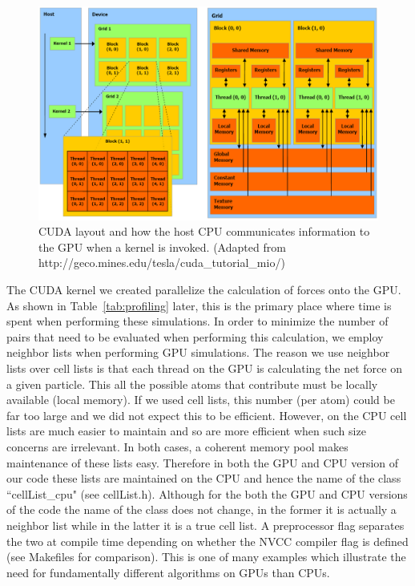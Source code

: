 \documentclass[12pt]{article}
\begin{document}
\begin{figure}[H]
   	\includegraphics[width=\textwidth]{gpu2.png}
	\caption{CUDA layout and how the host CPU communicates information to the GPU when a kernel is invoked. (Adapted from http://geco.mines.edu/tesla/cuda\_tutorial\_mio/)}
	\label{fig:cuda}
\end{figure}

The CUDA kernel we created parallelize the calculation of forces onto the GPU.  As shown in Table~\ref{tab:profiling} later, this is the primary place where time is spent when performing these simulations.  In order to minimize the number of pairs that need to be evaluated when performing this calculation, we employ neighbor lists when performing GPU simulations.  The reason we use neighbor lists over cell lists is that each thread on the GPU is calculating the net force on a given particle.  This all the possible atoms that contribute must be locally available (local memory).  If we used cell lists, this number (per atom) could be far too large and we did not expect this to be efficient.  However, on the CPU cell lists are much easier to maintain and so are more efficient when such size concerns are irrelevant.  In both cases, a coherent memory pool makes maintenance of these lists easy. Therefore in both the GPU and CPU version of our code these lists are maintained on the CPU and hence the name of the class ``cellList\_cpu" (see cellList.h).  Although for the both the GPU and CPU versions of the code the name of the class does not change, in the former it is actually a neighbor list while in the latter it is a true cell list.  A preprocessor flag separates the two at compile time depending on whether the NVCC compiler flag is defined (see Makefiles for comparison).  This is one of many examples which illustrate the need for fundamentally different algorithms on GPUs than CPUs.
\end{document}
